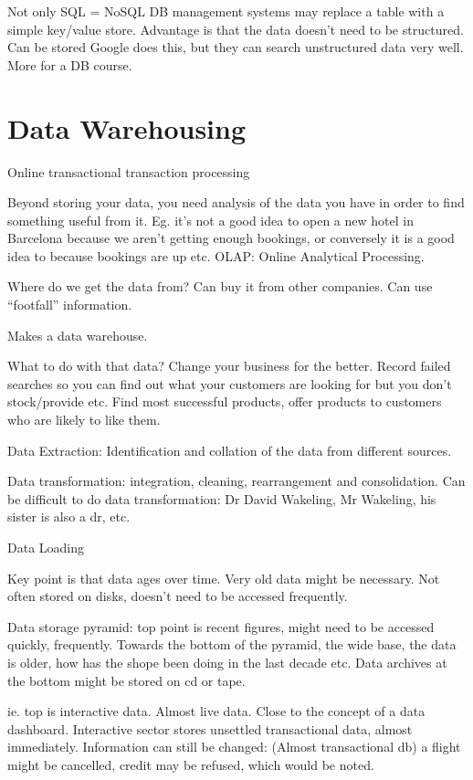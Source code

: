 \documentclass[11pt]{article}
\begin{document}
Not only SQL = NoSQL DB management systems may replace a table with a simple key/value store. Advantage is that the data doesn’t need to be structured. Can be stored Google does this, but they can search unstructured data very well. More for a DB course.


\section{Data Warehousing}

Online transactional transaction processing

Beyond storing your data, you need analysis of the data you have in order to find something useful from it. Eg. it’s not a good idea to open a new hotel in Barcelona because we aren’t getting enough bookings, or conversely it is a good idea to because bookings are up etc. OLAP: Online Analytical Processing.

Where do we get the data from? Can buy it from other companies. Can use “footfall” information.

Makes a data warehouse.

What to do with that data? Change your business for the better. Record failed searches so you can find out what your customers are looking for but you don’t stock/provide etc. Find most successful products, offer products to customers who are likely to like them.

Data Extraction: Identification and collation of the data from different sources.

Data transformation: integration, cleaning, rearrangement and consolidation. Can be difficult to do data transformation: Dr David Wakeling, Mr Wakeling, his sister is also a dr, etc.

Data Loading

Key point is that data ages over time. Very old data might be necessary. Not often stored on disks, doesn’t need to be accessed frequently.

Data storage pyramid: top point is recent figures, might need to be accessed quickly, frequently. Towards the bottom of the pyramid, the wide base, the data is older, how has the shope been doing in the last decade etc. Data archives at the bottom might be stored on cd or tape.

ie. top is interactive data. Almost live data. Close to the concept of a data dashboard. Interactive sector stores unsettled transactional data, almost immediately. Information can still be changed: (Almost transactional db) a flight might be cancelled, credit may be refused, which would be noted.
\end{document}

